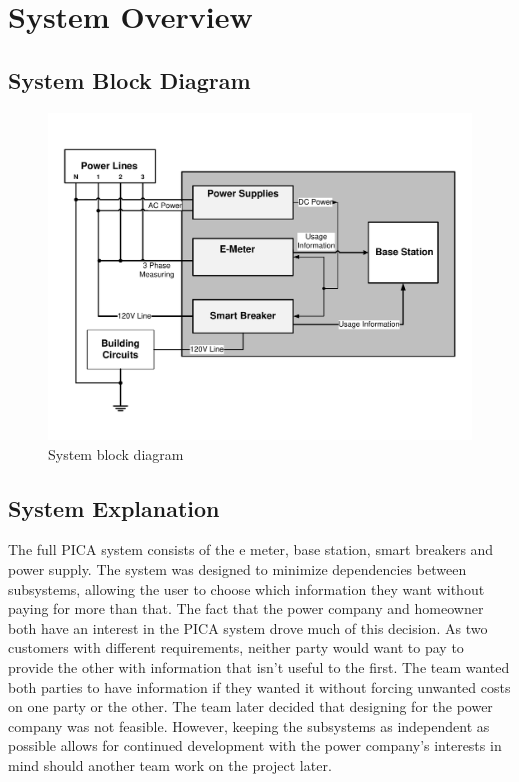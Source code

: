 \section{System Overview}


\subsection{System Block Diagram}
\begin{figure}[htbp]
  \centering
  \includegraphics[width=\textwidth]{includes/PICA_System_Diagram_B}
  \caption{System block diagram}
  \label{fig:system_block_diagram}
\end{figure}

\subsection{System Explanation}

The full PICA system consists of the e meter, base station, smart breakers and power supply. The system was designed to minimize dependencies between subsystems, allowing the user to choose which information they want without paying for more than that. The fact that the power company and homeowner both have an interest in the PICA system drove much of this decision. As two customers with different requirements, neither party would want to pay to provide the other with information that isn't useful to the first. The team wanted both parties to have information if they wanted it without forcing unwanted costs on one party or the other. The team later decided that designing for the power company was not feasible. However, keeping the subsystems as independent as possible allows for continued development with the power company's interests in mind should another team work on the project later.

